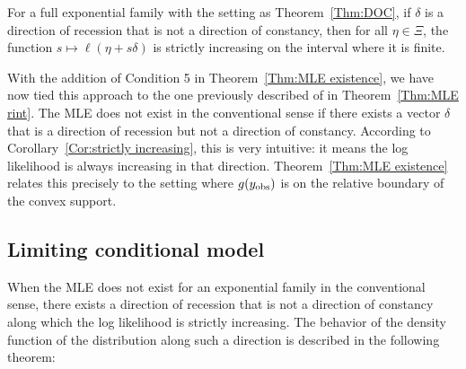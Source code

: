 \begin{corollary} \label{Cor:strictly increasing}
For a full exponential family with the setting as Theorem~\ref{Thm:DOC}, if $\delta$ is a
direction of recession that is not a direction of constancy, 
then for all $\eta \in \Xi$, the function $s \mapsto \ell(\eta+s\delta)$ is strictly
increasing on the interval where it is finite.
\end{corollary}


With the addition of Condition 5 in Theorem~\ref{Thm:MLE existence}, we have now  
tied this approach to the one previously described of \citet{Barndorff} in 
Theorem~\ref{Thm:MLE rint}.  
The MLE does not exist in the conventional sense if there exists a vector 
$\delta$ that is a direction of recession but not a direction of constancy.  
According to Corollary~\ref{Cor:strictly increasing}, this is very intuitive:
it means the log likelihood is always increasing in that direction.  
Theorem~\ref{Thm:MLE existence} relates this
precisely to the setting where $g(y_{\text{obs}})$ is on the relative boundary of
the convex support.






\subsection{Limiting conditional model} \label{S:LCM}
When the MLE does not exist for an exponential family in the conventional sense, there 
exists a direction of recession that is not a direction of constancy 
along which the log likelihood is strictly increasing.  The behavior of the 
density function of the distribution along such a direction 
is described in the following theorem:

